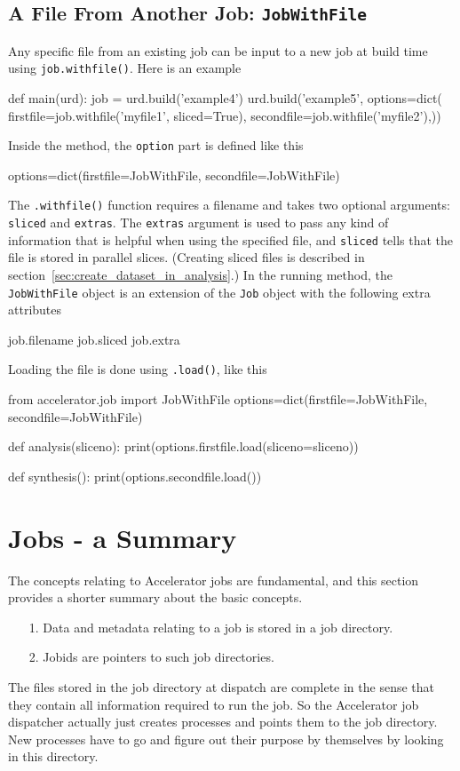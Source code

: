 \subsection{A File From Another Job:  \texttt{JobWithFile}}
\label{sec:jobwithfile}
Any specific file from an existing job can be input to a new job at
build time using \texttt{job.withfile()}.  Here is an example
\begin{python}
def main(urd):
    job = urd.build('example4')
    urd.build('example5',
        options=dict(
            firstfile=job.withfile('myfile1', sliced=True),
            secondfile=job.withfile('myfile2'),))
\end{python}
Inside the method, the \texttt{option} part is defined like this
\begin{python}
options=dict(firstfile=JobWithFile, secondfile=JobWithFile)
\end{python}
The \texttt{.withfile()} function requires a filename and takes two
optional arguments: \texttt{sliced} and \texttt{extras}.  The
\texttt{extras} argument is used to pass any kind of information that
is helpful when using the specified file, and \texttt{sliced} tells
that the file is stored in parallel slices.  (Creating sliced files is
described in section~\ref{sec:create_dataset_in_analysis}.)  In the
running method, the \texttt{JobWithFile} object is an extension of the
\texttt{Job} object with the following extra attributes
\begin{python}
job.filename
job.sliced
job.extra
\end{python}
Loading the file is done using \texttt{.load()}, like this
\begin{python}
from accelerator.job import JobWithFile
options=dict(firstfile=JobWithFile, secondfile=JobWithFile)

def analysis(sliceno):
    print(options.firstfile.load(sliceno=sliceno))

def synthesis():
    print(options.secondfile.load())
\end{python}



\section{Jobs - a Summary}
The concepts relating to Accelerator jobs are fundamental, and this
section provides a shorter summary about the basic concepts.

\begin{itemize}
\item[1.]  Data and metadata relating to a job is stored in a
job directory.
\item[2.]  Jobids are pointers to such job directories.
\end{itemize}
The files stored in the job directory at dispatch are complete in the
sense that they contain all information required to run the job.  So
the Accelerator job dispatcher actually just creates processes and
points them to the job directory.  New processes have to go and figure
out their purpose by themselves by looking in this directory.

